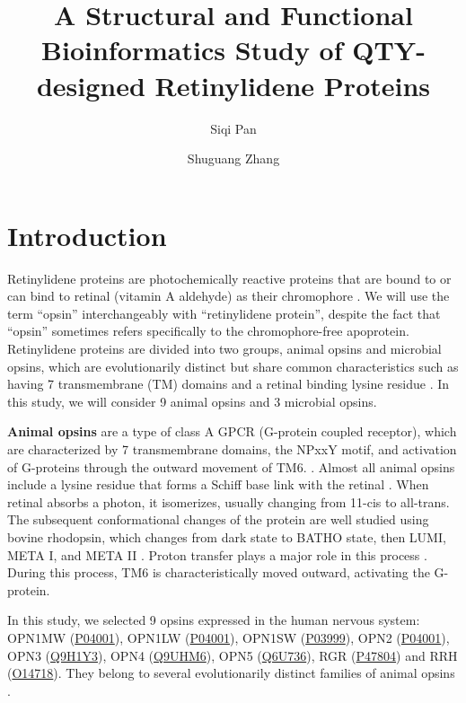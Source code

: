 \documentclass[fleqn,10pt,lineno]{manuscript}
\title{A Structural and Functional Bioinformatics Study of QTY-designed Retinylidene Proteins}
\author[1]{Siqi Pan}
\author[2]{Shuguang Zhang}
\affil[1]{Shanghai World Foreign Language Academy, 400 Baihua Street, Shanghai 200233, China}
\affil[2]{Lab of Molecular Architecture, Media Lab, Massachusetts Institute of Technology, 77 Massachusetts Avenue, Cambridge, MA 02139, USA}
\begin{document}
\flushbottom
\maketitle
\thispagestyle{empty}

\section*{Introduction}

Retinylidene proteins are photochemically reactive proteins that are bound to or can bind to retinal (vitamin A aldehyde) as their chromophore \citep{Spudich_2000}. We will use the term ``opsin'' interchangeably with ``retinylidene protein'', despite the fact that ``opsin'' sometimes refers specifically to the chromophore-free apoprotein. Retinylidene proteins are divided into two groups, animal opsins and microbial opsins, which are evolutionarily distinct but share common characteristics such as having 7 transmembrane (TM) domains and a retinal binding lysine residue \citep{Yee_2013, Spudich_2000}. In this study, we will consider 9 animal opsins and 3 microbial opsins. 

\textbf{Animal opsins} are a type of class A GPCR (G-protein coupled receptor), which are characterized by 7 transmembrane domains, the NPxxY motif, and activation of G-proteins through the outward movement of TM6. \citep{Sakmar_2002, Nordstrom_2011, Zhou_2019}. Almost all animal opsins include a lysine residue that forms a Schiff base link with the retinal \citep{Bownds_1967, Guhmann_2022}. When retinal absorbs a photon, it isomerizes, usually changing from 11-cis to all-trans. The subsequent conformational changes of the protein are well studied using bovine rhodopsin, which changes from dark state to BATHO state, then LUMI, META I, and META II \citep{Okada_2001, Smith_2010}. Proton transfer plays a major role in this process \citep{Mahalingam_2008}. During this process, TM6 is characteristically moved outward, activating the G-protein. 

In this study, we selected 9 opsins expressed in the human nervous system: OPN1MW (\href{https://www.uniprot.org/uniprotkb/P04001/entry}{P04001}), OPN1LW (\href{https://www.uniprot.org/uniprotkb/P04000/entry}{P04001}), OPN1SW (\href{https://www.uniprot.org/uniprotkb/P03999/entry}{P03999}), OPN2 (\href{https://www.uniprot.org/uniprotkb/P08100/entry}{P04001}), OPN3 (\href{https://www.uniprot.org/uniprotkb/Q9H1Y3/entry}{Q9H1Y3}), OPN4 (\href{https://www.uniprot.org/uniprotkb/Q9UHM6/entry}{Q9UHM6}), OPN5 (\href{https://www.uniprot.org/uniprotkb/Q6U736/entry}{Q6U736}), RGR (\href{https://www.uniprot.org/uniprotkb/P47804/entry}{P47804}) and RRH (\href{https://www.uniprot.org/uniprotkb/O14718/entry}{O14718}). They belong to several evolutionarily distinct families of animal opsins \citep{Terakita_2005, Shichida_2009}. 
\end{document}
